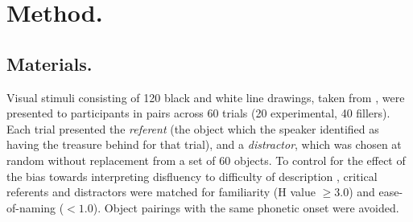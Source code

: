 \documentclass[a4paper,man,natbib]{apa6}
\begin{document}
\section{Method.}
\subsection{Materials.}
Visual stimuli consisting of 120 black and white line drawings, taken from \citet{Snodgrass1980}, were presented to participants in pairs across 60 trials (20 experimental, 40 fillers). 
Each trial presented the \textit{referent} (the object which the speaker identified as having the treasure behind for that trial), and a \textit{distractor}, which was chosen at random without replacement from a set of 60 objects. 
To control for the effect of the bias towards interpreting disfluency to difficulty of description \citep{Arnold2007}, critical referents and distractors were matched for familiarity (H value $\ge 3.0$) and ease-of-naming ($<1.0$). 
Object pairings with the same phonetic onset were avoided. \\
\end{document}
